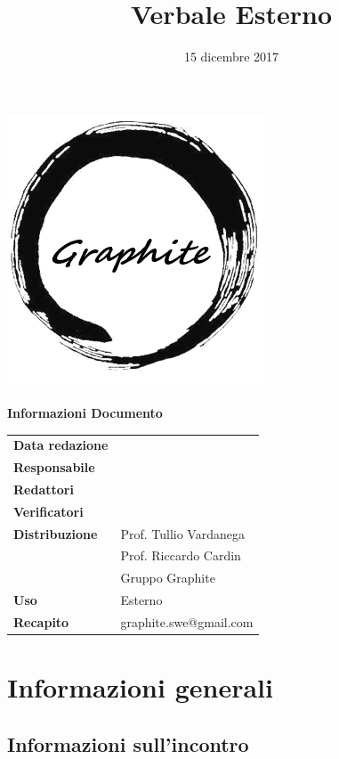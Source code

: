 \documentclass[openany,12pt,a4paper]{article}
\title{Verbale Esterno}
\author{}
\date{15 dicembre 2017}
\begin{document}
	\makeatletter
	\begin{titlepage}
		\setlength{\headsep}{0pt}  
		\begin{center}
			\includegraphics[width=0.5\linewidth]{Logo.png}\\[1em]
			{\huge \bfseries  \@title }\\[10ex]
			\textbf{\Large Informazioni Documento} \\[2em]
			\bgroup
			\def\arraystretch{1.5}
			\begin{tabular}{l|l}
				\textbf{Data redazione} & \large \@date \\
				\textbf{Responsabile} &  \\
				\textbf{Redattori} &  \\
				\textbf{Verificatori} &  \\
				\textbf{Distribuzione} & Prof. Tullio Vardanega \\
				 & Prof. Riccardo Cardin \\
				 & Gruppo Graphite \\
				\textbf{Uso} & Esterno \\
				\textbf{Recapito} & graphite.swe@gmail.com \\
			\end{tabular}
		\egroup
		\end{center}
	\end{titlepage}
	\makeatother

	\thispagestyle{empty}
	\newpage
	
	\tableofcontents
	\newpage
	
	\section{Informazioni generali}
	
	\subsection{Informazioni sull'incontro}
	
\end{document}
